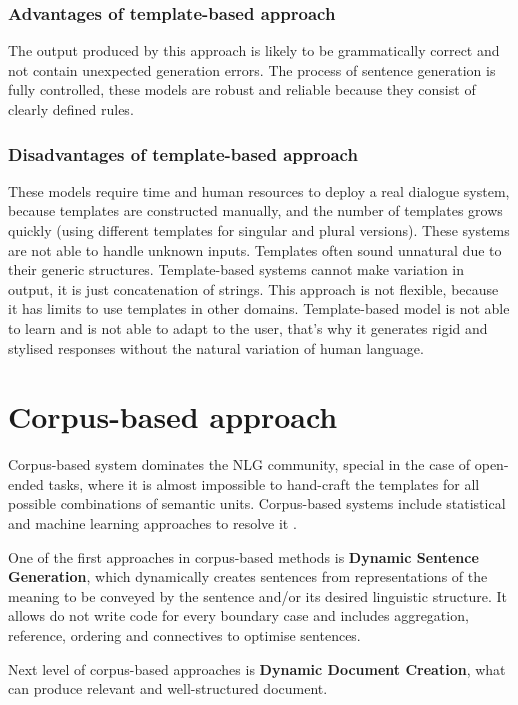 \subsubsection{Advantages of template-based approach}
The output produced by this approach is likely to be grammatically correct and not contain unexpected generation errors. The process of sentence generation is fully controlled, these models are robust and reliable because they consist of clearly defined rules. 

\subsubsection{Disadvantages of template-based approach}
These models require time and human resources to deploy a real dialogue system, because templates are constructed manually, and the number of templates grows quickly (using different templates for singular and plural versions). These systems are not able to handle unknown inputs. Templates often sound unnatural due to their generic structures. Template-based systems cannot make variation in output, it is just concatenation of strings. This approach is not flexible, because it has limits to use templates in other domains. Template-based model is not able to learn and is not able to adapt to the user, that's why it generates rigid and stylised responses without the natural variation of human language.

\section{Corpus-based approach}
Corpus-based system dominates the NLG community, special in the case of open-ended tasks, where it is almost impossible to hand-craft the templates for all possible combinations of semantic units. Corpus-based systems include statistical and machine learning approaches to resolve it \cite{rudnicky2002dialog}.

One of the first approaches in corpus-based methods is \textbf{Dynamic Sentence Generation}, which dynamically creates sentences from representations of the meaning to be conveyed by the sentence and/or its desired linguistic structure. It allows do not write code for every boundary case and includes aggregation, reference, ordering and connectives to optimise sentences.

Next level of corpus-based approaches is \textbf{Dynamic Document Creation}, what can produce relevant and well-structured document. 

